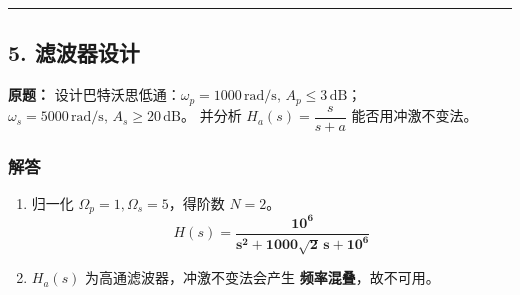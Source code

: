 \vspace{1em}
\hrule
\vspace{1em}

\subsection{5. 滤波器设计}
\noindent\textbf{原题：}
设计巴特沃思低通：$\omega_p=1000\,\text{rad/s},\,A_p\le3\,\text{dB}$；$\omega_s=5000\,\text{rad/s},\,A_s\ge20\,\text{dB}$。
并分析 $H_a(s)=\dfrac{s}{s+a}$ 能否用冲激不变法。

\subsubsection{解答}
\begin{enumerate}[label=(\arabic*)]
    \item
    归一化 $\Omega_p=1,\Omega_s=5$，得阶数 $N=2$。
    \[
    H(s) = \boldsymbol{\frac{10^6}{s^2+1000\sqrt{2}\,s+10^6}}
    \]

    \item
    $H_a(s)$ 为高通滤波器，冲激不变法会产生 \textbf{频率混叠}，故不可用。
\end{enumerate}
